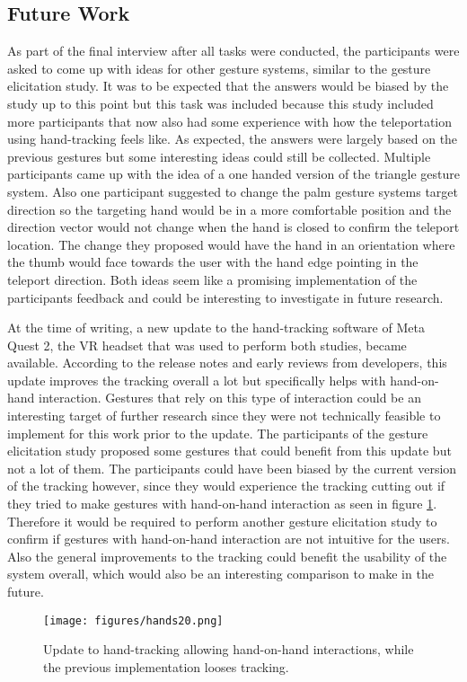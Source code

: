 \subsection{Future Work}

As part of the final interview after all tasks were conducted, the participants were asked to come up with ideas for other gesture systems, similar to the gesture elicitation study. It was to be expected that the answers would be biased by the study up to this point but this task was included because this study included more participants that now also had some experience with how the teleportation using hand-tracking feels like. As expected, the answers were largely based on the previous gestures but some interesting ideas could still be collected. Multiple participants came up with the idea of a one handed version of the triangle gesture system. Also one participant suggested to change the palm gesture systems target direction so the targeting hand would be in a more comfortable position and the direction vector would not change when the hand is closed to confirm the teleport location. The change they proposed would have the hand in an orientation where the thumb would face towards the user with the hand edge pointing in the teleport direction. Both ideas seem like a promising implementation of the participants feedback and could be interesting to investigate in future research.

At the time of writing, a new update to the hand-tracking software of Meta Quest 2, the VR headset that was used to perform both studies, became available. According to the release notes and early reviews from developers, %
this update improves the tracking overall a lot but specifically helps with hand-on-hand interaction. Gestures that rely on this type of interaction could be an interesting target of further research since they were not technically feasible to implement for this work prior to the update. The participants of the gesture elicitation study proposed some gestures that could benefit from this update but not a lot of them. The participants could have been biased  by the current version of the tracking however, since they would experience the tracking cutting out if they tried to make gestures with hand-on-hand interaction as seen in figure \ref{fig:hands20}. Therefore it would be required to perform another gesture elicitation study to confirm if gestures with hand-on-hand interaction are not intuitive for the users. Also the general improvements to the tracking could benefit the usability of the system overall, which would also be an interesting comparison to make in the future. 

\begin{figure}[!ht]
    \centering
    \texttt{[image: figures/hands20.png]}
    \caption{Update to hand-tracking allowing hand-on-hand interactions, while the previous implementation looses tracking.}
    \label{fig:hands20}
\end{figure}